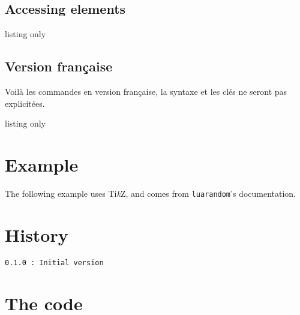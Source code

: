 \documentclass[11pt,a4paper]{ltxdoc}
\providecommand\tikzlogo{Ti\textit{k}Z}
\let\TikZ\tikzlogo
\begin{document}
\subsection{Accessing elements}

\begin{DemoCode}{listing only}
\end{DemoCode}


\subsection{Version française}

Voilà les commandes en version française, la syntaxe et les clés ne seront pas explicitées.

\begin{DemoCode}{listing only}
\ListeRandint[Min=...,Max=...,Nb=...,Repet=...,Graine=...,Tri=...,Sep=...]{\macro}

\end{DemoCode}

\begin{DemoCode}{}
\ListeRandint[Min=5,Max=15,Nb=7,Repet,Tri=croiss,Sep={/}]{\maliste}\maliste

\end{DemoCode}

\pagebreak

\section{Example}

The following example uses \TikZ, and comes from \texttt{luarandom}'s documentation.

\begin{DemoCode}{}
\end{DemoCode}

\pagebreak

\section{History}

\texttt{0.1.0 : Initial version}

\section{The code}

\end{document}
